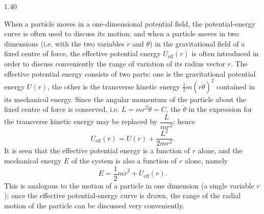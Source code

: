 \begin{solution}{1.40}
\begin{commentary}
When a particle moves in a one-dimensional potential field, the potential-energy curve is often used to discuss its motion; and when a particle moves in two dimensions (i.e. with the two variables $r$ and $\theta$) in the gravitational field of a fixed centre of force, the effective potential energy $U_{\mathrm{eff}}(r)$ is often introduced in order to discuss conveniently the range of variation of its radius vector $r$. The effective potential energy consists of two parts: one is the gravitational potential energy $U(r)$, the other is the transverse kinetic energy $\frac{1}{2}m(r\dot{\theta})^2$ contained in its mechanical energy. Since the angular momentum of the particle about the fixed centre of force is conserved, i.e. $L=mr^2\dot{\theta}=C$, the $\dot{\theta}$ in the expression for the transverse kinetic energy may be replaced by $\dfrac{L}{mr^2}$; hence
\[
U_{\mathrm{eff}}(r)=U(r)+\frac{L^2}{2mr^2}.
\]
It is seen that the effective potential energy is a function of $r$ alone, and the mechanical energy $E$ of the system is also a function of $r$ alone, namely
\[
E=\frac{1}{2}m\dot{r}^2+U_{\mathrm{eff}}(r).
\]
This is analogous to the motion of a particle in one dimension (a single variable $r$); once the effective potential-energy curve is drawn, the range of the radial motion of the particle can be discussed very conveniently.
\end{commentary}
\end{solution}


